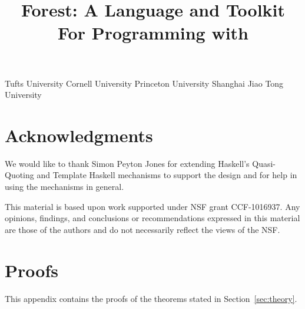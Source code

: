 \documentclass[nocopyrightspace,natbib,preprint]{sigplanconf}
\newif\ifanon\anonfalse  %
\begin{document}


\copyrightdata{} 

\title{Forest: A Language and Toolkit For Programming with \Filestores{}}

\ifanon
\authorinfo{\vskip -2in}
 	   {\vskip -2in}
           {}
\else
{}
	   {Tufts University}{}
           {Cornell University}{}
           {Princeton University}{}
           {Shanghai Jiao Tong University}{}
\fi

\maketitle{}

\begin{abstract}  

\end{abstract}












\section*{Acknowledgments}
We would like to thank Simon Peyton Jones for extending Haskell's
Quasi-Quoting and Template Haskell mechanisms to support the \forest{}
design and for help in using the mechanisms in general.

This material is based upon work supported under NSF grant
CCF-1016937.  Any opinions, findings, and conclusions or
recommendations expressed in this material are those of the authors
and do not necessarily reflect the views of the NSF.




\ifanon
\else
\onecolumn
\newpage
\appendix

\closeproofchan
\section{Proofs}

\noindent This appendix contains the proofs of the theorems stated in
Section~\ref{sec:theory}.

\label{sec:proof-appendix}



\fi
\end{document}

